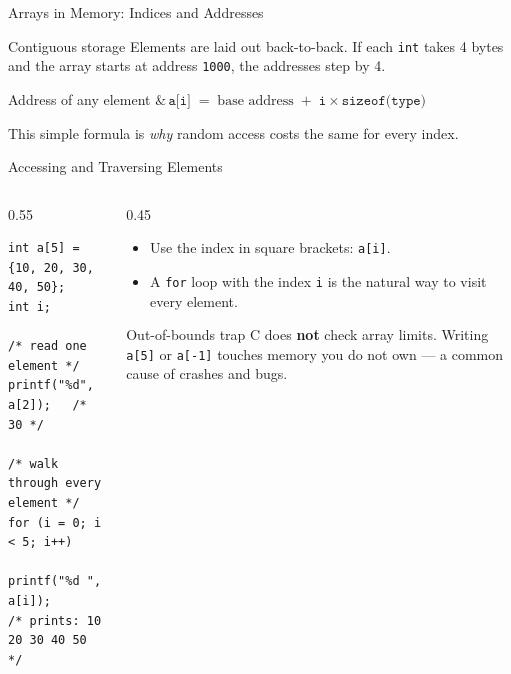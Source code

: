 \documentclass[aspectratio=169]{beamer}
\begin{document}
	\begin{frame}{Arrays in Memory: Indices and Addresses}
		\begin{block}{Contiguous storage}
			Elements are laid out back-to-back. If each \texttt{int} takes 4 bytes and the array
			starts at address \texttt{1000}, the addresses step by 4.
		\end{block}
		\centering
		\vspace{0.2cm}
		\begin{block}{Address of any element}
			\centering $\&\,\texttt{a[i]} \;=\; \text{base address} \;+\; \texttt{i} \times \texttt{sizeof(type)}$
		\end{block}
		\centering\footnotesize This simple formula is \emph{why} random access costs the same for every index.
	\end{frame}

	\begin{frame}[fragile]{Accessing and Traversing Elements}
		\begin{columns}[T]
			\begin{column}{0.55\textwidth}
				\begin{lstlisting}
int a[5] = {10, 20, 30, 40, 50};
int i;

/* read one element */
printf("%d", a[2]);   /* 30 */

/* walk through every element */
for (i = 0; i < 5; i++)
    printf("%d ", a[i]);
/* prints: 10 20 30 40 50 */
				\end{lstlisting}
			\end{column}
			\begin{column}{0.45\textwidth}
				\begin{itemize}\small
					\item Use the index in square brackets: \texttt{a[i]}.
					\item A \texttt{for} loop with the index \texttt{i} is the natural way to visit every element.
				\end{itemize}
				\begin{block}{Out-of-bounds trap}
					\small C does \textbf{not} check array limits. Writing \texttt{a[5]} or \texttt{a[-1]}
					touches memory you do not own --- a common cause of crashes and bugs.
				\end{block}
			\end{column}
		\end{columns}
	\end{frame}
\end{document}
